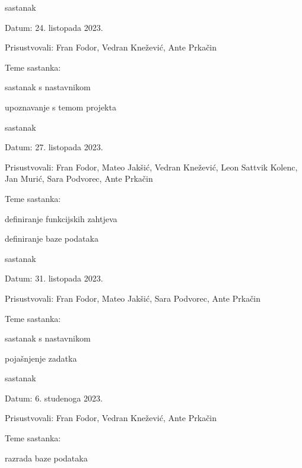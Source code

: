 \begin{packed_enum}
			\item  sastanak
			\item[] \begin{packed_item}
				\item Datum: {24. listopada 2023.}
				\item Prisustvovali: {Fran Fodor, Vedran Knežević, Ante Prkačin}
				\item Teme sastanka:
				\begin{packed_item}
					\item  sastanak s nastavnikom
					\item  upoznavanje s temom projekta
				\end{packed_item}
			\end{packed_item}

			\item  sastanak
			\item[] \begin{packed_item}
				\item Datum: {27. listopada 2023.}
				\item Prisustvovali: {Fran Fodor, Mateo Jakšić, Vedran Knežević, Leon Sattvik Kolenc, Jan Murić, Sara Podvorec, Ante Prkačin}
				\item Teme sastanka:
				\begin{packed_item}
					\item  definiranje funkcijskih zahtjeva
					\item  definiranje baze podataka
				\end{packed_item}
			\end{packed_item}

			\item  sastanak
			\item[] \begin{packed_item}
				\item Datum: {31. listopada 2023.}
				\item Prisustvovali: {Fran Fodor, Mateo Jakšić, Sara Podvorec, Ante Prkačin}
				\item Teme sastanka:
				\begin{packed_item}
					\item  sastanak s nastavnikom
					\item  pojašnjenje zadatka
				\end{packed_item}
			\end{packed_item}

			\item  sastanak
			\item[] \begin{packed_item}
				\item Datum: {6. studenoga 2023.}
				\item Prisustvovali: {Fran Fodor, Vedran Knežević, Ante Prkačin}
				\item Teme sastanka:
				\begin{packed_item}
					\item  razrada baze podataka
				\end{packed_item}
			\end{packed_item}


\end{packed_enum}
